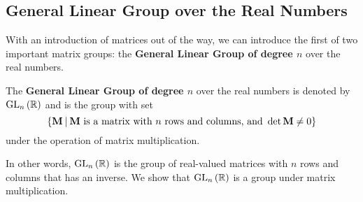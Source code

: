 \subsection{General Linear Group over the Real Numbers}\label{subsection-GLR-matrix-group}
With an introduction of matrices out of the way, we can introduce the first of two important matrix groups: the \textbf{General Linear Group of degree $n$} over the real numbers.
\begin{definition}
    The \textbf{General Linear Group of degree $n$} over the real numbers is denoted by $\mathrm{GL}_{n}\left(\mathbb{R}\right)$ and is the group with set
    \[
        \left\{\textbf{M} \vert \text{\textbf{M} is a matrix with } n \text{ rows and columns, and } \det \textbf{M} \neq 0\right\}
    \]
    under the operation of matrix multiplication.
\end{definition}
In other words, $\mathrm{GL}_{n}\left(\mathbb{R}\right)$ is the group of real-valued matrices with $n$ rows and columns that has an inverse. We show that $\mathrm{GL}_{n}\left(\mathbb{R}\right)$ is a group under matrix multiplication.
